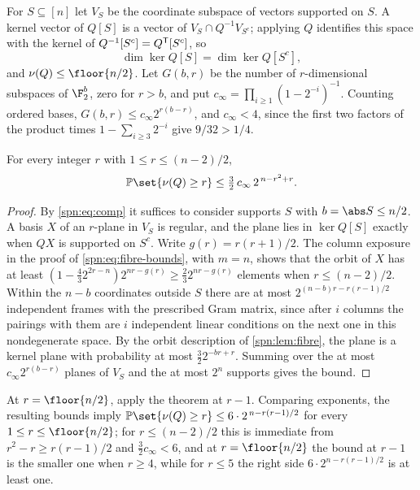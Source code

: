 
For $S\subseteq[n]$ let $V_S$ be the coordinate subspace of vectors supported on $S$. A kernel
vector of $Q[S]$ is a vector of $V_S\cap Q^{-1}V_{S^c}$; applying $Q$ identifies this space
with the kernel of $Q^{-1}[S^c]=Q^{\mathsf{T}}[S^c]$, so
\begin{equation}\label{spn:eq:comp}
 \dim\ker Q[S]=\dim\ker Q[S^c],
\end{equation}
and $\nu(Q)\le\floor{n/2}$. Let $G(b,r)$ be the number of $r$-dimensional subspaces of
$\F_2^b$, zero for $r>b$, and put $c_\infty=\prod_{i\ge1}(1-2^{-i})^{-1}$. Counting ordered
bases, $G(b,r)\le c_\infty2^{r(b-r)}$, and $c_\infty<4$, since the first two factors of the
product times $1-\sum_{i\ge3}2^{-i}$ give $9/32>1/4$.

\begin{theorem}\label{spn:thm:binary}
For every integer $r$ with $1\le r\le(n-2)/2$,
\[
 \spnP\set{\nu(Q)\ge r}\le\tfrac32\,c_\infty\,2^{\,n-r^2+r}.
\]
\end{theorem}

\begin{proof}
By \eqref{spn:eq:comp} it suffices to consider supports $S$ with $b=\abs S\le n/2$. A basis
$X$ of an $r$-plane in $V_S$ is regular, and the plane lies in $\ker Q[S]$ exactly when $QX$ is
supported on $S^c$. Write $g(r)=r(r+1)/2$. The column exposure in the proof of
\eqref{spn:eq:fibre-bounds}, with $m=n$, shows that the orbit of $X$ has at least
$(1-\tfrac43 2^{2r-n})2^{nr-g(r)}\ge\tfrac23 2^{nr-g(r)}$ elements when $r\le(n-2)/2$. Within
the $n-b$ coordinates outside $S$ there are at most $2^{(n-b)r-r(r-1)/2}$ independent frames
with the prescribed Gram matrix, since after $i$ columns the pairings with them are $i$
independent linear conditions on the next one in this nondegenerate space. By the orbit
description of \cref{spn:lem:fibre}, the plane is a kernel plane with probability at most
$\tfrac32 2^{-br+r}$. Summing over the at most $c_\infty2^{r(b-r)}$ planes of $V_S$ and the at
most $2^n$ supports gives the bound.
\end{proof}

At $r=\floor{n/2}$, apply the theorem at $r-1$. Comparing exponents, the resulting bounds imply
$\spnP\set{\nu(Q)\ge r}\le6\cdot2^{\,n-r(r-1)/2}$ for every $1\le r\le\floor{n/2}$; for
$r\le(n-2)/2$ this is immediate from $r^2-r\ge r(r-1)/2$ and $\tfrac32c_\infty<6$, and at
$r=\floor{n/2}$ the bound at $r-1$ is the smaller one when $r\ge4$, while for $r\le5$ the right
side $6\cdot2^{n-r(r-1)/2}$ is at least one.


